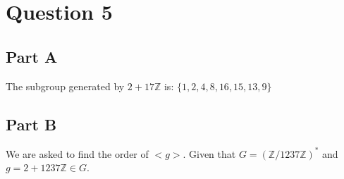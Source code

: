 \documentclass{article}
\numberwithin{equation}{subsection}
\begin{document}
	\newpage
	\thispagestyle{fancy}
	
	\section*{Question 5}
	\subsection*{Part A}
	The subgroup generated by $2+17\mathbb{Z}$ is: \quad
	$\{1,2,4,8,16,15,13,9\}$

	\vspace{25pt}
	\subsection*{Part B}
	We are asked to find the order of $<g>$. Given that $G=(\mathbb{Z}/1237\mathbb{Z})^*$ and $g=2+1237\mathbb{Z} \in G$.
\end{document}
